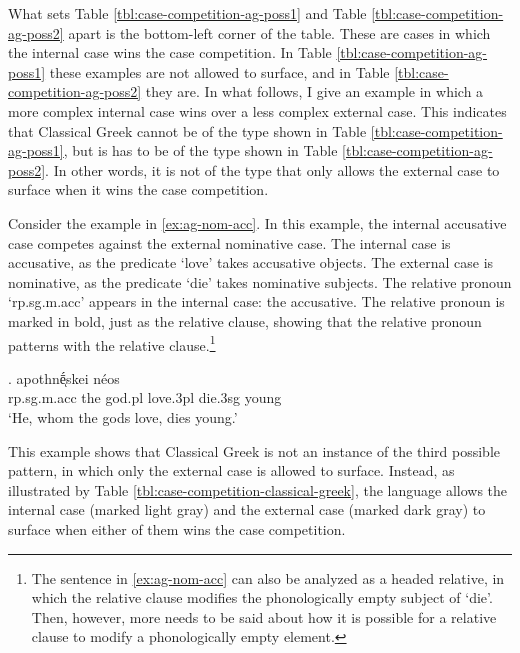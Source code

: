 What sets Table \ref{tbl:case-competition-ag-poss1} and Table \ref{tbl:case-competition-ag-poss2} apart is the bottom-left corner of the table. These are cases in which the internal case wins the case competition.
In Table \ref{tbl:case-competition-ag-poss1} these examples are not allowed to surface, and in Table \ref{tbl:case-competition-ag-poss2} they are.
In what follows, I give an example in which a more complex internal case wins over a less complex external case. This indicates that Classical Greek cannot be of the type shown in Table \ref{tbl:case-competition-ag-poss1}, but is has to be of the type shown in Table \ref{tbl:case-competition-ag-poss2}. In other words, it is not of the type that only allows the external case to surface when it wins the case competition.

Consider the example in \ref{ex:ag-nom-acc}. In this example, the internal accusative case competes against the external nominative case.
The internal case is accusative, as the predicate  `love' takes accusative objects.
The external case is nominative, as the predicate  `die' takes nominative subjects.
The relative pronoun  `\ac{rp}.\ac{sg}.\ac{m}.\ac{acc}' appears in the internal case: the accusative. The relative pronoun is marked in bold, just as the relative clause, showing that the relative pronoun patterns with the relative clause.\footnote{
The sentence in \ref{ex:ag-nom-acc} can also be analyzed as a headed relative, in which the relative clause modifies the phonologically empty subject of  `die'. Then, however, more needs to be said about how it is possible for a relative clause to modify a phonologically empty element.
}

\exg.     apothnḗͅskei néos\\
\ac{rp}.\ac{sg}.\ac{m}.\ac{acc} the god.\ac{pl} love.3\ac{pl}\scsub{[acc]} die.3\ac{sg}\scsub{[nom]} young\\
`He, whom the gods love, dies young.' \label{ex:ag-nom-acc}

This example shows that Classical Greek is not an instance of the third possible pattern, in which only the external case is allowed to surface. Instead, as illustrated by Table \ref{tbl:case-competition-classical-greek}, the language allows the internal case (marked light gray) and the external case (marked dark gray) to surface when either of them wins the case competition.

